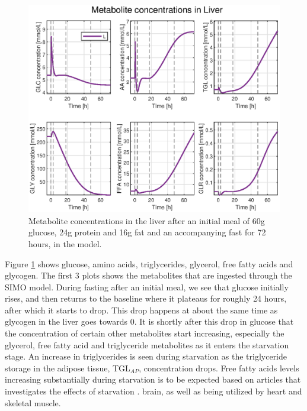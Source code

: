 \documentclass{IEEEtran}
\begin{document}
\begin{figure}[H]
    \centering
    \includegraphics[trim=35 10 35 0, clip,width=\columnwidth, height=0.3\textheight]{Diagrams/Fasting/liver_metabolites.eps}
    \caption{Metabolite concentrations in the liver after an initial meal of 60g glucose, 24g protein and 16g fat and an accompanying fast for 72 hours, in the model.}
    \label{fig:Liver_metabolites}
\end{figure}

Figure \ref{fig:Liver_metabolites} shows glucose, amino acids, triglycerides, glycerol, free fatty acids and glycogen. The first 3 plots shows the metabolites that are ingested through the SIMO model. During fasting after an initial meal, we see that glucose initially rises, and then returns to the baseline where it plateaus for roughly 24 hours, after which it starts to drop. This drop happens at about the same time as glycogen in the liver goes towards 0. It is shortly after this drop in glucose that the concentration of certain other metabolites start increasing, especially the glycerol, free fatty acid and triglyceride metabolites as it enters the starvation stage. An increase in triglycerides is seen during starvation as the triglyceride storage in the adipose tissue, TGL$_{AP}$, concentration drops. Free fatty acids levels increasing substantially during starvation is to be expected based on articles that investigates the effects of starvation \cite{unger_eisentraut_madison_1963, yaffe_1980A}.
brain, as well as being utilized by heart and skeletal muscle.\\
\end{document}
